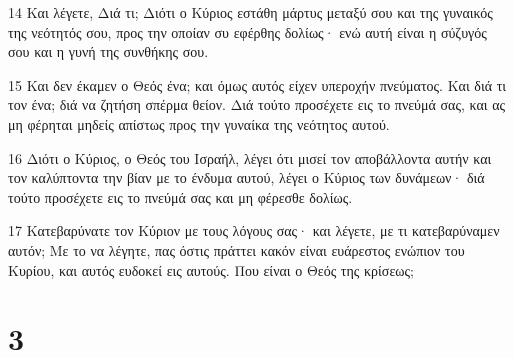 \par 14 Και λέγετε, Διά τι; Διότι ο Κύριος εστάθη μάρτυς μεταξύ σου και της γυναικός της νεότητός σου, προς την οποίαν συ εφέρθης δολίως· ενώ αυτή είναι η σύζυγός σου και η γυνή της συνθήκης σου.
\par 15 Και δεν έκαμεν ο Θεός ένα; και όμως αυτός είχεν υπεροχήν πνεύματος. Και διά τι τον ένα; διά να ζητήση σπέρμα θείον. Διά τούτο προσέχετε εις το πνεύμά σας, και ας μη φέρηται μηδείς απίστως προς την γυναίκα της νεότητος αυτού.
\par 16 Διότι ο Κύριος, ο Θεός του Ισραήλ, λέγει ότι μισεί τον αποβάλλοντα αυτήν και τον καλύπτοντα την βίαν με το ένδυμα αυτού, λέγει ο Κύριος των δυνάμεων· διά τούτο προσέχετε εις το πνεύμά σας και μη φέρεσθε δολίως.
\par 17 Κατεβαρύνατε τον Κύριον με τους λόγους σας· και λέγετε, με τι κατεβαρύναμεν αυτόν; Με το να λέγητε, πας όστις πράττει κακόν είναι ευάρεστος ενώπιον του Κυρίου, και αυτός ευδοκεί εις αυτούς. Που είναι ο Θεός της κρίσεως;

\chapter{3}


